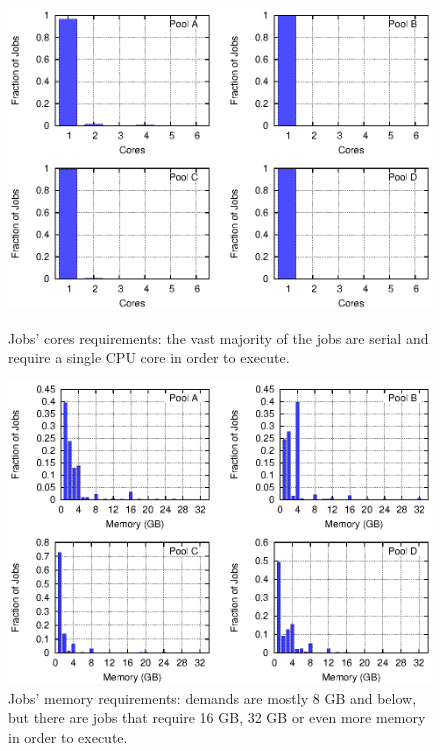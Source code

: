 \begin{figure}[p]\centering
	\includegraphics{figures/cores_multiplot.eps}
\caption{Jobs' cores requirements: the vast majority of the jobs are
  serial and require a single CPU core in order to execute.}
\label{fig:cores_usage_multiplot}
	\includegraphics{figures/memory_multiplot.eps}
\caption{Jobs' memory requirements: demands are mostly 8 GB and below,
  but there are jobs that require 16 GB, 32 GB or even more memory in
  order to execute.}
\label{fig:memory_usage_multiplot}
\end{figure}

